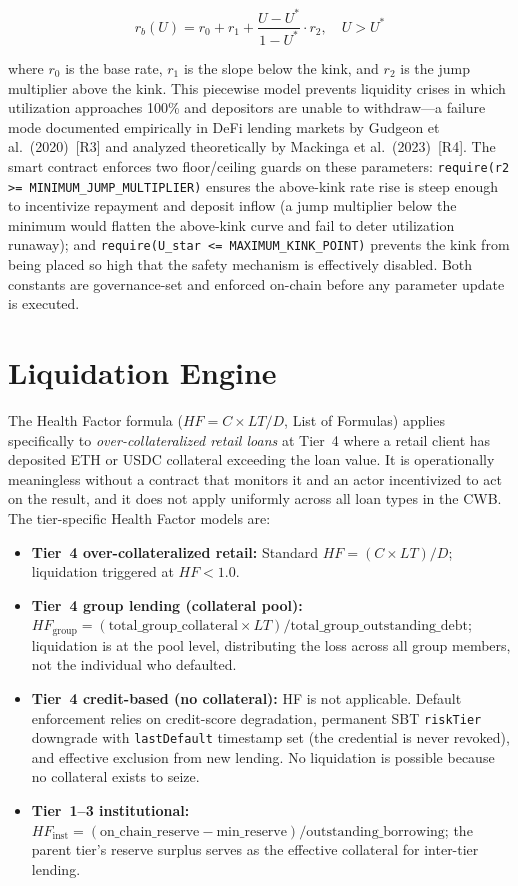 \documentclass[12pt,a4paper]{report}
\begin{document}
\begin{equation}
r_b(U) = r_0 + r_1 + \frac{U - U^*}{1 - U^*} \cdot r_2, \quad U > U^* \tag{Formula 19}
\end{equation}

where $r_0$ is the base rate, $r_1$ is the slope below the kink, and $r_2$ is the jump multiplier above the kink. This piecewise model prevents liquidity crises in which utilization approaches 100\% and depositors are unable to withdraw---a failure mode documented empirically in DeFi lending markets by Gudgeon et al.~(2020)~[R3] and analyzed theoretically by Mackinga et al.~(2023)~[R4]. The smart contract enforces two floor/ceiling guards on these parameters: \texttt{require(r2 >= MINIMUM\_JUMP\_MULTIPLIER)} ensures the above-kink rate rise is steep enough to incentivize repayment and deposit inflow (a jump multiplier below the minimum would flatten the above-kink curve and fail to deter utilization runaway); and \texttt{require(U\_star <= MAXIMUM\_KINK\_POINT)} prevents the kink from being placed so high that the safety mechanism is effectively disabled. Both constants are governance-set and enforced on-chain before any parameter update is executed.

\section{Liquidation Engine}
\label{sec:liquidation}

The Health Factor formula ($HF = C \times LT / D$, List of Formulas) applies specifically to \textit{over-collateralized retail loans} at Tier~4 where a retail client has deposited ETH or USDC collateral exceeding the loan value. It is operationally meaningless without a contract that monitors it and an actor incentivized to act on the result, and it does not apply uniformly across all loan types in the CWB. The tier-specific Health Factor models are:

\begin{itemize}[noitemsep]
\item \textbf{Tier~4 over-collateralized retail:} Standard $HF = (C \times LT) / D$; liquidation triggered at $HF < 1.0$.
\item \textbf{Tier~4 group lending (collateral pool):} $HF_{\text{group}} = (\text{total\_group\_collateral} \times LT) / \text{total\_group\_outstanding\_debt}$; liquidation is at the pool level, distributing the loss across all group members, not the individual who defaulted.
\item \textbf{Tier~4 credit-based (no collateral):} HF is not applicable. Default enforcement relies on credit-score degradation, permanent SBT \texttt{riskTier} downgrade with \texttt{lastDefault} timestamp set (the credential is never revoked), and effective exclusion from new lending. No liquidation is possible because no collateral exists to seize.
\item \textbf{Tier~1--3 institutional:} $HF_{\text{inst}} = (\text{on\_chain\_reserve} - \text{min\_reserve}) / \text{outstanding\_borrowing}$; the parent tier's reserve surplus serves as the effective collateral for inter-tier lending.
\end{itemize}
\end{document}

